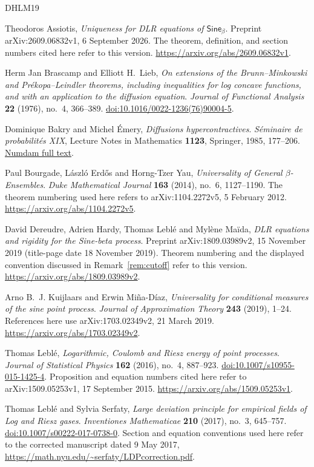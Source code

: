 \documentclass[11pt,reqno]{amsart}
\numberwithin{equation}{section}
\theoremstyle{definition}
\theoremstyle{remark}
\newcommand{\1}{\mathbf 1}
\begin{document}
\begin{thebibliography}{DHLM19}

Theodoros Assiotis,
\emph{Uniqueness for DLR equations of $\mathsf{Sine}_\beta$}.
Preprint arXiv:2609.06832v1, 6 September 2026.
The theorem, definition, and section numbers cited here refer to this version.
\url{https://arxiv.org/abs/2609.06832v1}.

Herm Jan Brascamp and Elliott H.~Lieb,
\emph{On extensions of the Brunn--Minkowski and Pr\'ekopa--Leindler
theorems, including inequalities for log concave functions, and with
an application to the diffusion equation}.
\emph{Journal of Functional Analysis} \textbf{22} (1976), no.~4,
366--389. \href{https://doi.org/10.1016/0022-1236(76)90004-5}
{doi:10.1016/0022-1236(76)90004-5}.

Dominique Bakry and Michel \'Emery,
\emph{Diffusions hypercontractives}.
\emph{S\'eminaire de probabilit\'es XIX}, Lecture Notes in Mathematics
\textbf{1123}, Springer, 1985, 177--206.
\href{https://www.numdam.org/item/SPS_1985__19__177_0/}
{Numdam full text}.


Paul Bourgade, L\'aszl\'o Erd\H{o}s and Horng-Tzer Yau,
\emph{Universality of General $\beta$-Ensembles}.
\emph{Duke Mathematical Journal} \textbf{163} (2014), no.~6,
1127--1190. The theorem numbering used here refers to
arXiv:1104.2272v5, 5 February 2012.
\url{https://arxiv.org/abs/1104.2272v5}.

David Dereudre, Adrien Hardy, Thomas Lebl\'e and Myl\`ene Ma\"ida,
\emph{DLR equations and rigidity for the Sine-beta process}.
Preprint arXiv:1809.03989v2, 15 November 2019
(title-page date 18 November 2019).
Theorem numbering and the displayed convention discussed in
Remark~\ref{rem:cutoff} refer to this version.
\url{https://arxiv.org/abs/1809.03989v2}.

Arno B.~J. Kuijlaars and Erwin Mi\~na-D\'iaz,
\emph{Universality for conditional measures of the sine point process}.
\emph{Journal of Approximation Theory} \textbf{243} (2019), 1--24.
References here use arXiv:1703.02349v2, 21 March 2019.
\url{https://arxiv.org/abs/1703.02349v2}.

Thomas Lebl\'e,
\emph{Logarithmic, Coulomb and Riesz energy of point processes}.
\emph{Journal of Statistical Physics} \textbf{162} (2016), no.~4,
887--923. \href{https://doi.org/10.1007/s10955-015-1425-4}
{doi:10.1007/s10955-015-1425-4}.
Proposition and equation numbers cited here refer to
arXiv:1509.05253v1, 17 September 2015.
\url{https://arxiv.org/abs/1509.05253v1}.

Thomas Lebl\'e and Sylvia Serfaty,
\emph{Large deviation principle for empirical fields of Log and Riesz gases}.
\emph{Inventiones Mathematicae} \textbf{210} (2017), no.~3, 645--757.
\href{https://doi.org/10.1007/s00222-017-0738-0}
{doi:10.1007/s00222-017-0738-0}.
Section and equation conventions used here refer to the corrected
manuscript dated 9 May 2017,
\url{https://math.nyu.edu/~serfaty/LDPcorrection.pdf}.

\end{thebibliography}
\end{document}
